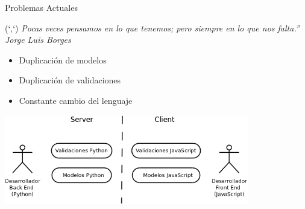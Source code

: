 \documentclass[xcolor=dvipsnames, 14pt]{beamer}
\newenvironment{reference}[2]{%
  \begin{textblock*}{\textwidth}(#1,#2)
      \footnotesize\it\bgroup\color{gray!50!black}}{\egroup\end{textblock*}}
\begin{document}
\begin{frame}{Problemas Actuales}
\begin{reference}{4mm}{85mm}
``Pocas veces pensamos en lo que tenemos; pero siempre en lo que nos falta.'' Jorge Luis Borges
\end{reference}
    \begin{itemize}
        \item Duplicación de modelos
        \item Duplicación de validaciones
        \item Constante cambio del lenguaje
    \end{itemize}
    \begin{center}
        \includegraphics[width=0.8\textwidth]{img/problemas.png}
    \end{center}
\end{frame}
\end{document}
